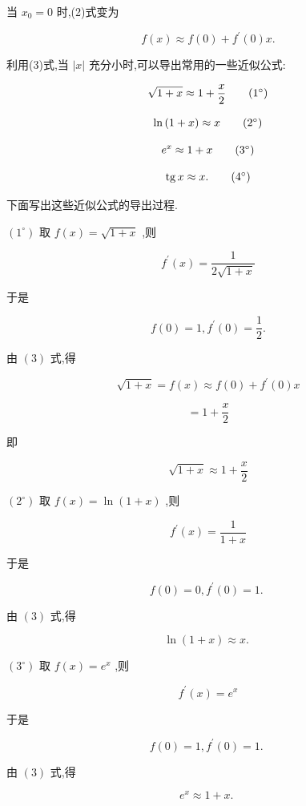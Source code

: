 \documentclass[lang=cn,newtx,10pt,scheme=chinese]{elegantbook}
\begin{document}
当 \({x}_{0} = 0\) 时,(2)式变为

\[
f\left( x\right) \approx f\left( 0\right) + {f}^{\prime }\left( 0\right) x. \tag{3}
\]

利用(3)式,当 \(\left| x\right|\) 充分小时,可以导出常用的一些近似公式:

\[
\sqrt{1 + x} \approx 1 + \frac{x}{2} \tag{${1}^{\circ}$}
\]


\[
\ln \left( {1 + x}\right) \approx x \tag{${2}^{\circ}$}
\]

\[
{e}^{x} \approx 1 + x \tag{${3}^{\circ}$}
\]

\[
\operatorname{tg}x \approx x\text{.} \tag{${4}^{\circ}$}
\]

下面写出这些近似公式的导出过程.

\(\left( {1}^{ \circ }\right)\) 取 \(f\left( x\right) = \sqrt{1 + x}\) ,则

\[
{f}^{\prime }\left( x\right) = \frac{1}{2\sqrt{1 + x}}
\]

于是

\[
f\left( 0\right) = 1,{f}^{\prime }\left( 0\right) = \frac{1}{2}.
\]

由 \(\left( 3\right)\) 式,得

\[
\sqrt{1 + x} = f\left( x\right) \approx f\left( 0\right) + {f}^{\prime }\left( 0\right) x
\]

\[
= 1 + \frac{x}{2}
\]

即

\[
\sqrt{1 + x} \approx 1 + \frac{x}{2}
\]

\(\left( {2}^{ \circ }\right)\) 取 \(f\left( x\right) = \ln \left( {1 + x}\right)\) ,则

\[
{f}^{\prime }\left( x\right) = \frac{1}{1 + x}
\]

于是

\[
f\left( 0\right) = 0,{f}^{\prime }\left( 0\right) = 1\text{. }
\]

由 \(\left( 3\right)\) 式,得

\[
\ln \left( {1 + x}\right) \approx x\text{. }
\]

\(\left( {3}^{ \circ }\right)\) 取 \(f\left( x\right) = {e}^{x}\) ,则

\[
{f}^{\prime }\left( x\right) = {e}^{x}
\]

于是

\[
f\left( 0\right) = 1,{f}^{\prime }\left( 0\right) = 1\text{. }
\]

由 \(\left( 3\right)\) 式,得

\[
{e}^{x} \approx 1 + x\text{. }
\]
\end{document}
